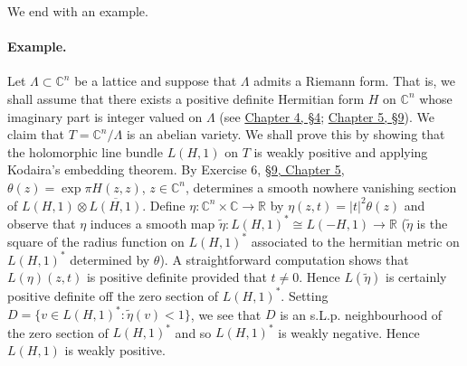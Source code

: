 We end with an example.

\paragraph{Example.} Let $\Lambda\subset\mathbb{C}^n$ be a lattice and suppose that $\Lambda$ admits a Riemann form. That is, we shall assume that there exists a positive definite Hermitian form $H$ on $\mathbb{C}^n$ whose imaginary part is integer valued on $\Lambda$ (see \hyperref[sec:4:4]{Chapter 4, \S4}; \hyperref[sec:5:9]{Chapter 5, \S9}). We claim that $T=\mathbb{C}^n/\Lambda$ is an abelian variety. We shall prove this by showing that the holomorphic line bundle $L(H,1)$ on $T$ is weakly positive and applying Kodaira's embedding theorem. By Exercise 6, \hyperref[sec:5:9]{\S9, Chapter 5}, $\theta(z)=\exp\pi H(z,z)$, $z\in\mathbb{C}^n$, determines a smooth nowhere vanishing section of $L(H,1)\otimes\overline{L(H,1)}$. Define $\eta:\mathbb{C}^n\times\mathbb{C}\to\mathbb{R}$ by $\eta(z,t)=|t|^2\theta(z)$ and observe that $\eta$ induces a smooth map $\widetilde\eta:L(H,1)^*\cong L(-H,1)\to\mathbb{R}$ ($\widetilde\eta$ is the square of the radius function on $L(H,1)^*$ associated to the hermitian metric on $L(H,1)^*$ determined by $\theta$). A straightforward computation shows that $L(\eta)(z,t)$ is positive definite provided that $t\ne0$. Hence $L(\widetilde\eta)$ is certainly positive definite off the zero section of $L(H,1)^*$. Setting $D=\{v\in L(H,1)^*:\widetilde\eta(v)<1\}$, we see that $D$ is an s.L.p. neighbourhood of the zero section of $L(H,1)^*$ and so $L(H,1)^*$ is weakly negative. Hence $L(H,1)$ is weakly positive.

